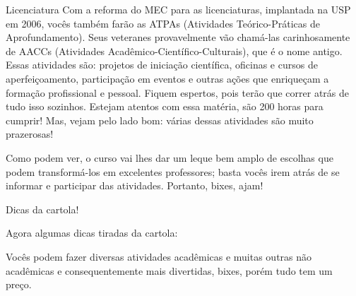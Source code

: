 \begin{subsecao}{Licenciatura}
Com a reforma do MEC para as licenciaturas, implantada na USP em 2006,
vocês também farão as ATPAs (Atividades Teórico-Práticas de Aprofundamento).
Seus veteranes provavelmente vão chamá-las carinhosamente de AACCs (Atividades
Acadêmico-Científico-Culturais), que é o nome antigo. Essas atividades são:
projetos de iniciação científica, oficinas e cursos de aperfeiçoamento,
participação em eventos e outras ações que enriqueçam a formação profissional e
pessoal. Fiquem espertos, pois terão que correr atrás de tudo isso sozinhos.
Estejam atentos com essa matéria, são 200 horas para cumprir! Mas, vejam pelo
lado bom: várias dessas atividades são muito prazerosas!

Como podem ver, o curso vai lhes dar um leque bem amplo de escolhas que
podem transformá-los em excelentes professores; basta vocês irem atrás de
se informar e participar das atividades. Portanto, bixes, ajam!

\begin{subsubsecao}{Dicas da cartola!}

Agora algumas dicas tiradas da cartola:

Vocês podem fazer diversas atividades acadêmicas e muitas outras não acadêmicas e
consequentemente mais divertidas, bixes, porém tudo tem um preço.


\end{subsubsecao}
\end{subsecao}
